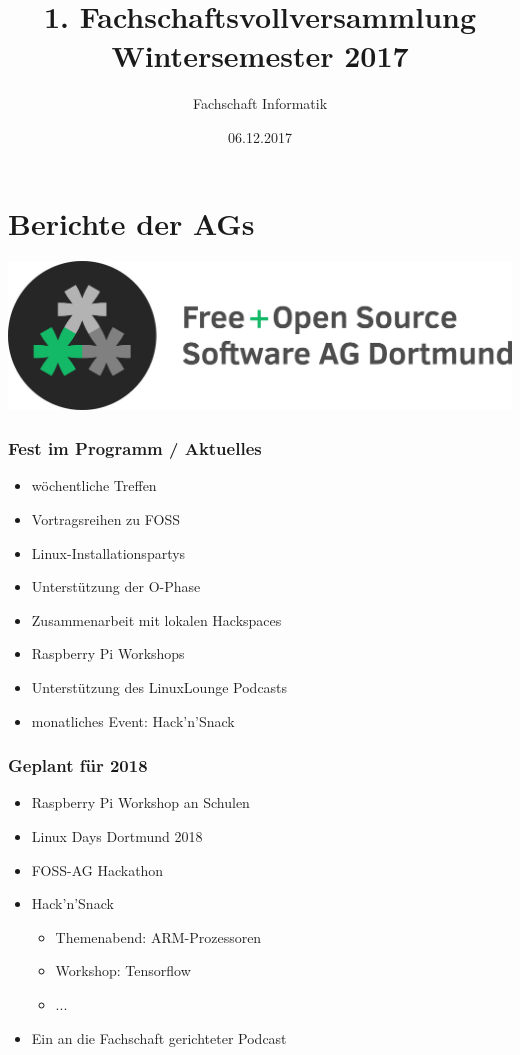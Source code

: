 \documentclass[xcolor=table]{beamer}
\title{1. Fachschaftsvollversammlung Wintersemester 2017}
\author{Fachschaft Informatik}
\date{06.12.2017}
\newcommand{\titleslide}[1]{
	\begin{frame}
		\huge #1 \normalfont
	\end{frame}
}
\begin{document}
\tudotitle

\section{Berichte der AGs}

\titleslide{\centering\includegraphics[scale=0.2]{res/logo_text-voll-transp.png}}

\begin{frame}
	\frametitle{Fest im Programm / Aktuelles}
	\begin{itemize}
		\item wöchentliche Treffen
		\item Vortragsreihen zu FOSS
		\item Linux-Installationspartys
		\item Unterstützung der O-Phase
		\item Zusammenarbeit mit lokalen Hackspaces
		\item Raspberry Pi Workshops
		\item Unterstützung des LinuxLounge Podcasts
		\item monatliches Event: Hack'n'Snack
	\end{itemize}
\end{frame}

\begin{frame}
	\frametitle{Geplant für 2018}
	\begin{itemize}
		\item Raspberry Pi Workshop an Schulen
		\item Linux Days Dortmund 2018
		\item FOSS-AG Hackathon
		\item Hack'n'Snack
		\begin{itemize}
			\item Themenabend: ARM-Prozessoren
			\item Workshop: Tensorflow
			\item ...
		\end{itemize}
		\item Ein an die Fachschaft gerichteter Podcast
	\end{itemize}
\end{frame}
\end{document}
